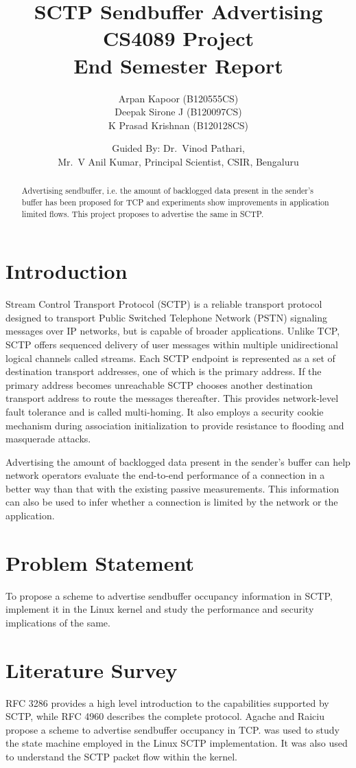 \documentclass[a4paper,11pt]{article}
\title{SCTP Sendbuffer Advertising\\
	{\normalsize CS4089 Project\\
		End Semester Report}}
\author{Arpan Kapoor (B120555CS)\\
	Deepak Sirone J (B120097CS)\\
	K Prasad Krishnan (B120128CS)\and
	Guided By: Dr.~Vinod Pathari,\\
	Mr.~V Anil Kumar, Principal Scientist, CSIR, Bengaluru}
\begin{document}
\maketitle

\begin{abstract}
Advertising sendbuffer, i.e.
the amount of backlogged data present in the sender's buffer 
has been proposed for TCP and experiments show
improvements in application limited flows.
This project proposes to advertise the same in SCTP.
\end{abstract}

\section{Introduction}
Stream Control Transport Protocol (SCTP) is a reliable transport protocol
designed to transport Public Switched Telephone Network (PSTN) signaling
messages over IP networks, but is capable of broader applications.
Unlike TCP, SCTP offers sequenced delivery of user messages within multiple
unidirectional logical channels called streams.
Each SCTP endpoint is represented as a set of destination transport addresses,
one of which is the primary address. If the primary address becomes unreachable
SCTP chooses another destination transport address to route the messages 
thereafter. This provides network-level fault tolerance and is called
multi-homing.
It also employs a security cookie mechanism during association initialization
to provide resistance to flooding and masquerade attacks.

Advertising the amount of backlogged data present in the sender's buffer can
help network operators evaluate the end-to-end performance of a connection
in a better way than that with the existing passive measurements.
This information can also be used to infer whether a connection is limited
by the network or the application.

\section{Problem Statement}
To propose a scheme to advertise sendbuffer occupancy information in SCTP,
implement it in the Linux kernel and study the performance and security
implications of the same.

\section{Literature Survey}
RFC 3286 \cite{rfc3286} provides a high level introduction to the capabilities
supported by SCTP, while RFC 4960 \cite{rfc4960} describes the complete
protocol. Agache and Raiciu \cite{tcp-sndbufadv} propose a scheme to advertise
sendbuffer occupancy in TCP. \cite{budigerelinux} was used to study the state
machine employed in the Linux SCTP implementation. It was also used to 
understand the SCTP packet flow within the kernel.
\end{document}
